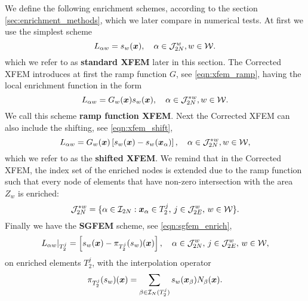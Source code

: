 We define the following enrichment schemes, according to the section \ref{sec:enrichment_methods},
which we later compare in numerical tests. At first we use the simplest scheme
\begin{equation} \label{eqn:prim_standard_xfem}
    L_{\alpha w} = s_{w}(\mathbf{\boldsymbol{x}}), \quad \alpha\in\mathcal{J}^w_{2N}, w\in\mathcal{W}.
\end{equation}
which we refer to as \textbf{standard XFEM} later in this section.
%
The Corrected XFEM introduces at first the ramp function $G$, see \eqref{eqn:xfem_ramp},
having the local enrichment function in the form
\begin{equation} \label{eqn:prim_xfem_ramp}
    L_{\alpha w} = G_w(\mathbf{\boldsymbol{x}}) s_{w}(\mathbf{\boldsymbol{x}}), \quad \alpha\in\mathcal{J}^{*w}_{2N}, w\in\mathcal{W}.
\end{equation}
We call this scheme \textbf{ramp function XFEM}.
Next the Corrected XFEM can also include the shifting, see \eqref{eqn:xfem_shift},
\begin{equation} \label{eqn:prim_xfem_shift}
    L_{\alpha w} = G_w(\mathbf{\boldsymbol{x}}) \left[s_w(\mathbf{\boldsymbol{x}}) - s_w(\mathbf{\boldsymbol{x}}_\alpha)\right],
    \quad \alpha\in\mathcal{J}^{*w}_{2N}, w\in\mathcal{W},
\end{equation} 
which we refer to as the \textbf{shifted XFEM}.
We remind that in the Corrected XFEM, the index set of the enriched nodes is extended due to the ramp function
such that every node of elements that have non-zero intersection with the area $Z_w$ is enriched:
\begin{equation} \label{eqn:prim_enriched_nodes_corr}
    \mathcal{J}^{*w}_{2N} = \{\alpha\in\mathcal{I}_{2N}: \mathbf{\boldsymbol{x}}_\alpha\in T^j_2,\, j\in\mathcal{J}^w_{2E},\, w\in\mathcal{W}\}.
\end{equation}
Finally we have the \textbf{SGFEM} scheme, see \eqref{eqn:sgfem_enrich},
\begin{equation} \label{eqn:prim_sgfem_enrich}
    L_{\alpha w}|_{T_2^j} = \left[s_w(\mathbf{\boldsymbol{x}}) - \pi_{T_2^j} (s_w)(\mathbf{\boldsymbol{x}})\right],
    \quad \alpha\in\mathcal{J}^w_{2N},\, j\in\mathcal{J}^w_{2E},\, w\in\mathcal{W},
\end{equation}
on enriched elements $T_2^j$,
with the interpolation operator
\begin{equation} \label{eqn:prim_sgfem_interpolation}
    \pi_{T_2^j} (s_w)(\mathbf{\boldsymbol{x}}) = \sum_{\beta\in\mathcal{I}_N(T_2^j)} s_w(\mathbf{\boldsymbol{x}}_\beta) N_\beta(\mathbf{\boldsymbol{x}}).
\end{equation}



